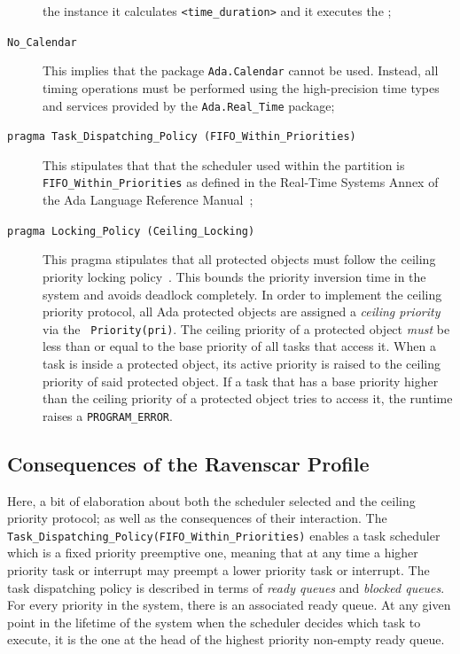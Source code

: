 \begin{description}
{  the instance it calculates \texttt{<time\_duration>} and it executes
  the ;}
\item[\texttt{No\_Calendar}]{This implies that the package
  \texttt{Ada.Calendar} cannot be used. Instead, all timing operations
  must be performed using the high-precision time types and services
  provided by the \texttt{Ada.Real\_Time} package;}
\item[\texttt{pragma Task\_Dispatching\_Policy
    (FIFO\_Within\_Priorities)}]{This stipulates that that the
  scheduler used within the partition is
  \texttt{FIFO\_Within\_Priorities} as defined in the Real-Time
  Systems Annex of the Ada Language Reference Manual~\cite{arm95,
    arm05};}
\item[\texttt{pragma Locking\_Policy (Ceiling\_Locking)}]{This pragma
  stipulates that all protected objects must follow the ceiling
  priority locking policy~\cite{sha@toc90}. This bounds the priority
  inversion time in the system and avoids deadlock completely. In
  order to implement the ceiling priority protocol, all Ada protected
  objects are assigned a \emph{ceiling priority} via the
  \texttt{ Priority(pri)}. The ceiling priority of a
  protected object \emph{must} be less than or equal to the base
  priority of all tasks that access it. When a task is inside a
  protected object, its active priority is raised to the ceiling
  priority of said protected object. If a task that has a base
  priority higher than the ceiling priority of a protected object
  tries to access it, the runtime raises a \texttt{PROGRAM\_ERROR}.}
\end{description}

\subsection{Consequences of the Ravenscar Profile}
Here, a bit of elaboration about both the scheduler selected and the
ceiling priority protocol; as well as the consequences of their
interaction. The 
\texttt{Task\_Dispatching\_Policy(FIFO\_Within\_Priorities)} enables a
task scheduler which is a fixed priority preemptive one, meaning that
at any time a higher priority task or interrupt may preempt a lower
priority task or interrupt. The task dispatching policy is described
in terms of \emph{ready queues} and \emph{blocked queues}. For every
priority in the system, there is an associated ready queue. At any
given point in the lifetime of the system when the scheduler decides
which task to execute, it is the one at the head of the highest
priority non-empty ready queue.

